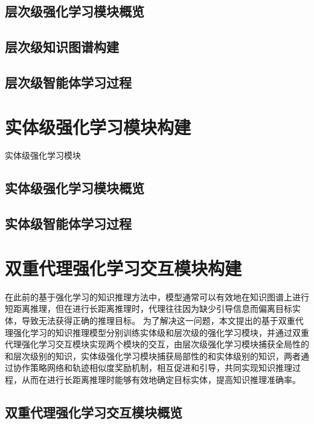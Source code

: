 \documentclass[algorithmlist, AutoFakeBold, AutoFakeSlant, figurelist, tablelist, nomlist, masters]{seuthesix}
\begin{document}
\subsection{层次级强化学习模块概览}


\subsection{层次级知识图谱构建}


\subsection{层次级智能体学习过程}


\section{实体级强化学习模块构建}
实体级强化学习模块


\subsection{实体级强化学习模块概览}


\subsection{实体级智能体学习过程}


\section{双重代理强化学习交互模块构建}
在此前的基于强化学习的知识推理方法中，模型通常可以有效地在知识图谱上进行短距离推理，但在进行长距离推理时，代理往往因为缺少引导信息而偏离目标实体，导致无法获得正确的推理目标。
为了解决这一问题，本文提出的基于双重代理强化学习的知识推理模型分别训练实体级和层次级的强化学习模块，并通过双重代理强化学习交互模块实现两个模块的交互，由层次级强化学习模块捕获全局性的和层次级别的知识，实体级强化学习模块捕获局部性的和实体级别的知识，两者通过协作策略网络和轨迹相似度奖励机制，相互促进和引导，共同实现知识推理过程，从而在进行长距离推理时能够有效地确定目标实体，提高知识推理准确率。


\subsection{双重代理强化学习交互模块概览}
\end{document}
